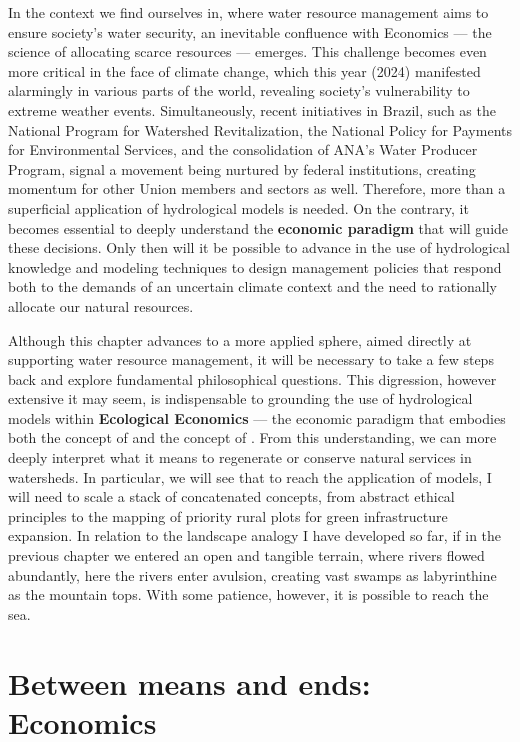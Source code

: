 \documentclass[./main_en.tex]{subfiles}
\begin{document}
\par In the context we find ourselves in, where water resource management aims to ensure society's water security, an inevitable confluence with Economics — the science of allocating scarce resources — emerges. This challenge becomes even more critical in the face of climate change, which this year (2024) manifested alarmingly in various parts of the world, revealing society's vulnerability to extreme weather events. Simultaneously, recent initiatives in Brazil, such as the National Program for Watershed Revitalization, the National Policy for Payments for Environmental Services, and the consolidation of ANA's Water Producer Program, signal a movement being nurtured by federal institutions, creating momentum for other Union members and sectors as well. Therefore, more than a superficial application of hydrological models is needed. On the contrary, it becomes essential to deeply understand the \textbf{economic paradigm} that will guide these decisions. Only then will it be possible to advance in the use of hydrological knowledge and modeling techniques to design management policies that respond both to the demands of an uncertain climate context and the need to rationally allocate our natural resources.

\par Although this chapter advances to a more applied sphere, aimed directly at supporting water resource management, it will be necessary to take a few steps back and explore fundamental philosophical questions. This digression, however extensive it may seem, is indispensable to grounding the use of hydrological models within \textbf{Ecological Economics} — the economic paradigm that embodies both the concept of  and the concept of . From this understanding, we can more deeply interpret what it means to regenerate or conserve natural services in watersheds. In particular, we will see that to reach the application of models, I will need to scale a stack of concatenated concepts, from abstract ethical principles to the mapping of priority rural plots for green infrastructure expansion. In relation to the landscape analogy I have developed so far, if in the previous chapter we entered an open and tangible terrain, where rivers flowed abundantly, here the rivers enter avulsion, creating vast swamps as labyrinthine as the mountain tops. With some patience, however, it is possible to reach the sea.

\section{Between means and ends: Economics} \label{chap:ecoeco:economy}
\end{document}
